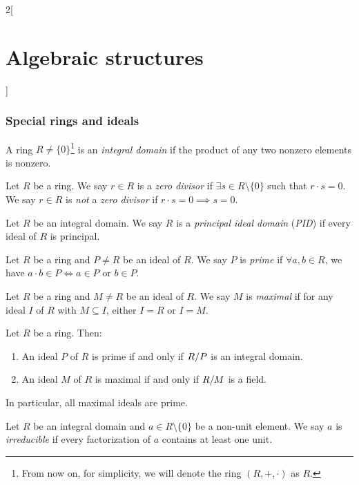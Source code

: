 \documentclass[../../../main.tex]{subfiles}
\begin{document}
\begin{multicols}{2}[\section{Algebraic structures}]
    \subsubsection*{Special rings and ideals}
    \begin{definition}
        A ring $R\ne\{0\}$\footnote{From now on, for simplicity, we will denote the ring $(R,+,\cdot)$ as $R$.} is an \textit{integral domain} if the product of any two nonzero elements is nonzero.
    \end{definition}
    \begin{definition}
        Let $R$ be a ring. We say $r\in R$ is a \textit{zero divisor} if $\exists s\in R\setminus\{0\}$ such that $r\cdot s=0$. We say $r\in R$ is \textit{not} a \textit{zero divisor} if $r\cdot s=0\implies s=0$.
    \end{definition}
    \begin{definition}
        Let $R$ be an integral domain. We say $R$ is a \textit{principal ideal domain} (\textit{PID}) if every ideal of $R$ is principal.
    \end{definition}
    \begin{definition}
        Let $R$ be a ring and $P\ne R$ be an ideal of $R$. We say $P$ is \textit{prime} if $\forall a,b\in R$, we have $a\cdot b\in P\iff a\in P\text{ or }b\in P$.
    \end{definition}
    \begin{definition}
        Let $R$ be a ring and $M\ne R$ be an ideal of $R$. We say $M$ is \textit{maximal} if for any ideal $I$ of $R$ with $M\subseteq I$, either $I=R$ or $I=M$.
    \end{definition}
    \begin{prop}
        Let $R$ be a ring. Then:
        \begin{enumerate}
            \item An ideal $P$ of $R$ is prime if and only if $\quot{R}{P}$ is an integral domain.
            \item An ideal $M$ of $R$ is maximal if and only if $\quot{R}{M}$ is a field.
        \end{enumerate}
        In particular, all maximal ideals are prime.
    \end{prop}
    \begin{definition}
        Let $R$ be an integral domain and $a\in R\setminus\{0\}$ be a non-unit element. We say $a$ is \textit{irreducible} if every factorization of $a$ contains at least one unit.
    \end{definition}

\end{multicols}
\end{document}
